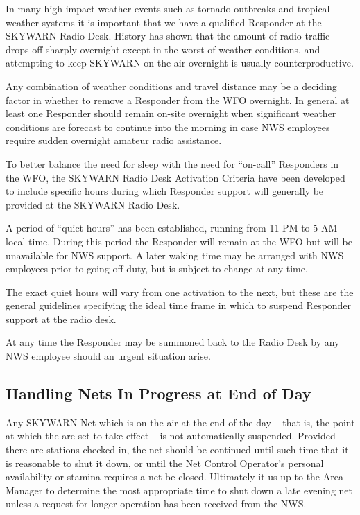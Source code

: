 \documentclass[pdflatex,letterpaper,twoside,12pt]{book}
\begin{document}
In many high-impact weather events such as tornado outbreaks and tropical weather systems it is important that we have a qualified Responder at the SKYWARN Radio Desk.  History has shown that the amount of radio traffic drops off sharply overnight except in the worst of weather conditions, and attempting to keep SKYWARN on the air overnight is usually counterproductive.

Any combination of weather conditions and travel distance may be a deciding factor in whether to remove a Responder from the WFO overnight.  In general at least one Responder should remain on-site overnight when significant weather conditions are forecast to continue into the morning in case NWS employees require sudden overnight amateur radio assistance.

To better balance the need for sleep with the need for ``on-call'' Responders in the WFO, the SKYWARN Radio Desk Activation Criteria have been developed to include specific hours during which Responder support will generally be provided at the SKYWARN Radio Desk.

A period of ``quiet hours'' has been established, running from 11 PM to 5 AM local time.  During this period the Responder will remain at the WFO but will be unavailable for NWS support.  A later waking time may be arranged with NWS employees prior to going off duty, but is subject to change at any time.

The exact quiet hours will vary from one activation to the next, but these are the general guidelines specifying the ideal time frame in which to suspend Responder support at the radio desk.

At any time the Responder may be summoned back to the Radio Desk by any NWS employee should an urgent situation arise.

\subsection{Handling Nets In Progress at End of Day}

Any SKYWARN Net which is on the air at the end of the day -- that is, the point at which the  are set to take effect -- is not automatically suspended.  Provided there are stations checked in, the net should be continued until such time that it is reasonable to shut it down, or until the Net Control Operator's personal availability or stamina requires a net be closed.  Ultimately it us up to the Area Manager to determine the most appropriate time to shut down a late evening net unless a request for longer operation has been received from the NWS.
\end{document}
